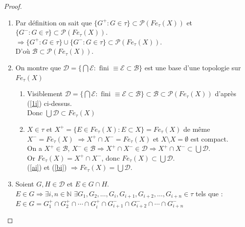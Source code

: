 \documentclass[11pt]{report}
\theoremstyle{styletheorem}
\theoremstyle{styledef}
\theoremstyle{remark}
\newcommand{\Fe}{\ensuremath{Fe_{\tau}(X)}}
\begin{document}
\begin{proof} \ \newline
	\begin{enumerate}
		\item  Par définition on sait que $\lbrace G^+: G \in \tau\rbrace \subset \mathcal{P}(Fe_{\tau}(X)) $ et $\lbrace G^- : G \in \tau \rbrace  \subset \mathcal{P}(Fe_{\tau}(X)) $.\\ 
		$\Rightarrow \lbrace G^+: G \in \tau\rbrace  \cup  \lbrace G^- : G \in \tau \rbrace \subset \mathcal{P}(Fe_{\tau}(X)) $.\label{1i}\\
		D'où $\mathcal{B} \subset \mathcal{P}(Fe_{\tau}(X)) $.
		
		\item On montre que $\mathcal{D} = \lbrace \bigcap \mathcal{E} : \text{ fini }\equiv \mathcal{E} \subset \mathcal{B} \rbrace$ est une base d'une topologie sur $\Fe$
		\begin{enumerate}
			\item Visiblement $\mathcal{D}= \lbrace \bigcap \mathcal{E} : \text{ fini }\equiv \mathcal{E} \subset \mathcal{B} \rbrace \subset \mathcal{B} \subset \mathcal{P}(\Fe)$ d'après (\ref{1i}) ci-dessus.\\
			Donc $\bigcup \mathcal{D} \subset \Fe$\label{ai}
			\item $X \in \tau$ et $X^+ = \lbrace E \in Fe_\tau (X) : E \subset X \rbrace = \Fe$ de même $X^- = \Fe$ $\Rightarrow X^+ \cap X^- = \Fe$ et $X\setminus X = \emptyset$ est compact.\\
			On a $X^+ \in \mathcal{B}$, $X^- \in \mathcal{B} \Rightarrow X^+ \cap X^- \in \mathcal{D} \Rightarrow X^+ \cap X^- \subset \bigcup \mathcal{D}$.\\
			Or $\Fe = X^+ \cap X^-$, donc $\Fe \subset \bigcup \mathcal{D}$.\label{bi}\\
			(\ref{ai}) et (\ref{bi}) $\Rightarrow \Fe = \bigcup \mathcal{D}$.
		\end{enumerate}
		\item Soient $G,H \in \mathcal{D}$ et $E \in G \cap H$.\\
		$E \in G \Rightarrow \exists i,n \in \mathbb{N}$ $\exists G_1, G_2, \dots,G_i,G_{i+1},G_{i+2}, \dots,G_{i+n} \in \tau $ tels que : \\  $E \in G =  G_1^+ \cap G_2^+ \cap \cdots \cap G_i^+ \cap G_{i+1}^- \cap G_{i+2}^- \cap \cdots \cap G_{i+n}^-$\\
		

\end{enumerate}
\end{proof}
\end{document}
